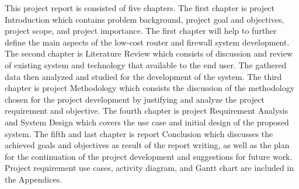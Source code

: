 \documentclass[../index.tex]{subfiles}
\begin{document}
This project report is consisted of five chapters. The first chapter is project Introduction which
contains problem background, project goal and objectives, project scope, and project importance. The
first chapter will help to further define the main aspects of the low-cost router and firewall
system development. The second chapter is Literature Review which consists of discussion and review
of existing system and technology that available to the end user. The gathered data then analyzed
and studied for the development of the system. The third chapter is project Methodology which
consists the discussion of the methodology chosen for the project development by justifying and
analyze the project requirement and objective. The fourth chapter is project Requirement Analysis
and System Design which covers the use case and initial design of the proposed system. The fifth and
last chapter is report Conclusion which discusses the achieved goals and objectives as result of the
report writing, as well as the plan for the continuation of the project development and suggestions
for future work. Project requirement use cases, activity diagram, and Gantt chart are included in
the Appendices.
\end{document}
